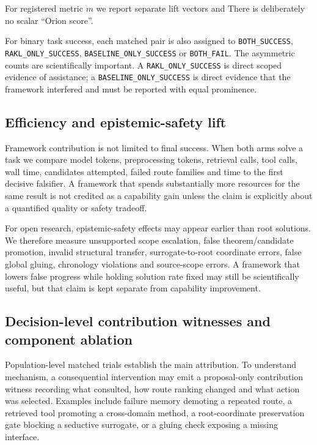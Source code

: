 For registered metric $m$ we report separate lift vectors
and
There is deliberately no scalar ``Orion score''.

For binary task success, each matched pair is also assigned to \texttt{BOTH\_SUCCESS}, \texttt{RAKL\_ONLY\_SUCCESS}, \texttt{BASELINE\_ONLY\_SUCCESS} or \texttt{BOTH\_FAIL}. The asymmetric counts are scientifically important. A \texttt{RAKL\_ONLY\_SUCCESS} is direct scoped evidence of assistance; a \texttt{BASELINE\_ONLY\_SUCCESS} is direct evidence that the framework interfered and must be reported with equal prominence.

\subsection{Efficiency and epistemic-safety lift}

Framework contribution is not limited to final success. When both arms solve a task we compare model tokens, preprocessing tokens, retrieval calls, tool calls, wall time, candidates attempted, failed route families and time to the first decisive falsifier. A framework that spends substantially more resources for the same result is not credited as a capability gain unless the claim is explicitly about a quantified quality or safety tradeoff.

For open research, epistemic-safety effects may appear earlier than root solutions. We therefore measure unsupported scope escalation, false theorem/candidate promotion, invalid structural transfer, surrogate-to-root coordinate errors, false global gluing, chronology violations and source-scope errors. A framework that lowers false progress while holding solution rate fixed may still be scientifically useful, but that claim is kept separate from capability improvement.

\subsection{Decision-level contribution witnesses and component ablation}

Population-level matched trials establish the main attribution. To understand mechanism, a consequential intervention may emit a proposal-only contribution witness recording what \RAKL{} consulted, how route ranking changed and what action was selected. Examples include failure memory demoting a repeated route, a retrieved tool promoting a cross-domain method, a root-coordinate preservation gate blocking a seductive surrogate, or a gluing check exposing a missing interface.

